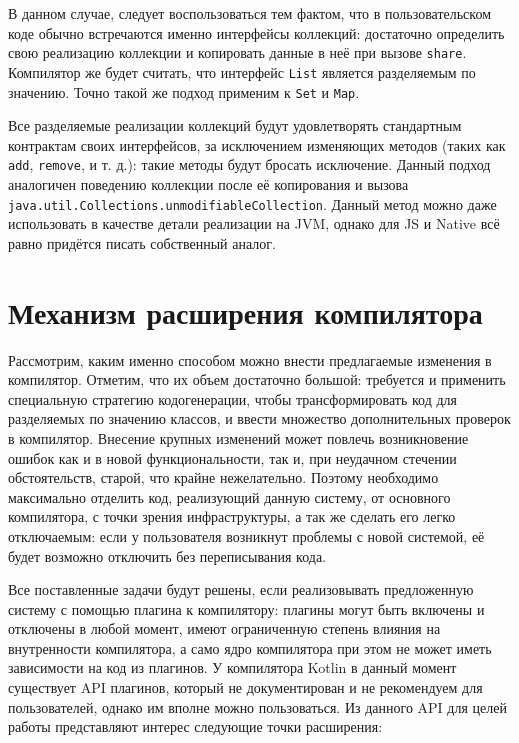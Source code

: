 \documentclass[specification,annotation,times]{itmo-student-thesis}
\begin{document}
В данном случае, следует воспользоваться тем фактом, что в пользовательском коде обычно встречаются именно интерфейсы коллекций: достаточно определить свою реализацию коллекции и копировать данные в неё при вызове \texttt{share}.
Компилятор же будет считать, что интерфейс \texttt{List} является разделяемым по значению.
Точно такой же подход применим к \texttt{Set} и \texttt{Map}.

Все разделяемые реализации коллекций будут удовлетворять стандартным контрактам своих интерфейсов, за исключением изменяющих методов (таких как \texttt{add}, \texttt{remove}, и т. д.): такие методы будут бросать исключение.
Данный подход аналогичен поведению коллекции после её копирования и вызова \texttt{java.util.Collections.unmodifiableCollection}. Данный метод можно даже использовать в качестве детали реализации на JVM, однако для JS и Native всё равно придётся писать собственный аналог.


\section{Механизм расширения компилятора}\label{codegen}

Рассмотрим, каким именно способом можно внести предлагаемые изменения в компилятор. Отметим, что их объем достаточно большой: требуется и применить специальную стратегию кодогенерации, чтобы трансформировать код для разделяемых по значению классов, и ввести множество дополнительных проверок в компилятор.
Внесение крупных изменений может повлечь возникновение ошибок как и в новой функциональности, так и, при неудачном стечении обстоятельств, старой, что крайне нежелательно.
Поэтому необходимо максимально отделить код, реализующий данную систему, от основного компилятора, с точки зрения инфраструктуры, а так же сделать его легко отключаемым: если у пользователя возникнут проблемы с новой системой, её будет возможно отключить без переписывания кода.

Все поставленные задачи будут решены, если реализовывать предложенную систему с помощью плагина к компилятору: плагины могут быть включены и отключены в любой момент, имеют ограниченную степень влияния на внутренности компилятора, а само ядро компилятора при этом не может иметь зависимости на код из плагинов.
У компилятора Kotlin в данный момент существует API плагинов, который не документирован и не рекомендуем для пользователей, однако им вполне можно пользоваться. Из данного API для целей работы представляют интерес следующие точки расширения:
\end{document}
